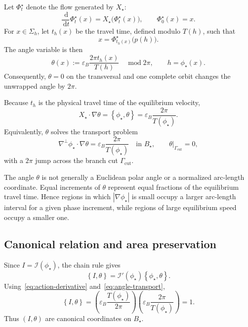 \documentclass[11pt,a4paper]{article}
\newcommand{\dd}{\,\mathrm{d}}
\newcommand{\bracket}[2]{\left\{#1,#2\right\}}
\newcommand{\abs}[1]{\left|#1\right|}
\begin{document}
Let $\Phi_t^\star$ denote the flow generated by $X_\star$:
\begin{equation}
  \frac{\dd}{\dd t}\Phi_t^\star(x)
  =X_\star\bigl(\Phi_t^\star(x)\bigr),
  \qquad
  \Phi_0^\star(x)=x.
  \label{eq:equilibrium-flow-map}
\end{equation}
For $x\in\Sigma_h$, let $t_h(x)$ be the travel time, defined modulo $T(h)$, such that
\begin{equation}
  x=\Phi_{t_h(x)}^\star\bigl(p(h)\bigr).
\end{equation}
The angle variable is then
\begin{equation}
  \theta(x)
  :=\varepsilon_B\frac{2\pi t_h(x)}{T(h)}
  \quad\operatorname{mod}2\pi,
  \qquad h=\phi_\star(x).
  \label{eq:angle-def}
\end{equation}
Consequently, $\theta=0$ on the transversal and one complete orbit changes the unwrapped angle by $2\pi$.

Because $t_h$ is the physical travel time of the equilibrium velocity,
\begin{equation}
  X_\star\cdot\nabla\theta
  =\bracket{\phi_\star}{\theta}
  =\varepsilon_B\frac{2\pi}{T(\phi_\star)}.
  \label{eq:angle-transport}
\end{equation}
Equivalently, $\theta$ solves the transport problem
\begin{equation}
  \nabla^\perp\phi_\star\cdot\nabla\theta
  =\varepsilon_B\frac{2\pi}{T(\phi_\star)}
  \quad\text{in }B_\star,
  \qquad
  \theta\big|_{\Gamma_{\mathrm{cut}}}=0,
  \label{eq:angle-pde}
\end{equation}
with a $2\pi$ jump across the branch cut $\Gamma_{\mathrm{cut}}$.

The angle $\theta$ is not generally a Euclidean polar angle or a normalized arc-length coordinate. Equal increments of $\theta$ represent equal fractions of the equilibrium travel time. Hence regions in which $\abs{\nabla\phi_\star}$ is small occupy a larger arc-length interval for a given phase increment, while regions of large equilibrium speed occupy a smaller one.

\subsection{Canonical relation and area preservation}

Since $I=\mathcal I(\phi_\star)$, the chain rule gives
\begin{equation}
  \bracket{I}{\theta}
  =\mathcal I'(\phi_\star)\bracket{\phi_\star}{\theta}.
\end{equation}
Using~\eqref{eq:action-derivative} and~\eqref{eq:angle-transport},
\begin{equation}
  \bracket{I}{\theta}
  =\left(\varepsilon_B\frac{T(\phi_\star)}{2\pi}\right)
   \left(\varepsilon_B\frac{2\pi}{T(\phi_\star)}\right)
  =1.
  \label{eq:canonical-relations}
\end{equation}
Thus $(I,\theta)$ are canonical coordinates on $B_\star$.
\end{document}
